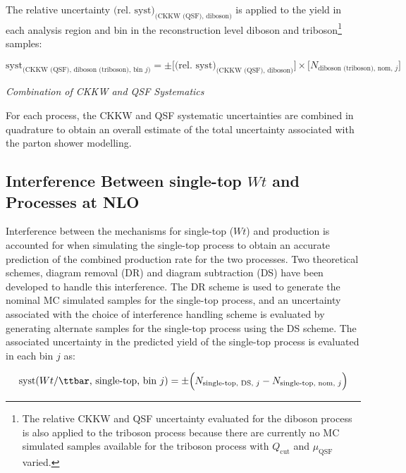\noindent The relative uncertainty \(\text{(rel. syst)}_\text{(CKKW (QSF), diboson)}\) is applied to the yield in each analysis region and bin in the reconstruction level diboson and triboson\footnote{The relative CKKW and QSF uncertainty evaluated for the diboson process is also applied to the triboson process because there are currently no MC simulated samples available for the triboson process with \(Q_\text{cut}\) and \(\mu_\text{QSF}\) varied.} samples:

\begin{footnotesize}
\begin{equation}
\label{eq:ckkw_wjets}
\text{syst}_\text{(CKKW (QSF), diboson (triboson), bin \(j\))} = \pm \bigg[\text{(rel. syst)}_\text{(CKKW (QSF), diboson)}\bigg] \times \bigg[N_\text{diboson (triboson), nom, \(j\)}\bigg]
\end{equation}
\end{footnotesize}

\vspace{1em}
\noindent\textit{Combination of CKKW and QSF Systematics}
\vspace{1em}

For each process, the CKKW and QSF systematic uncertainties are combined in quadrature to obtain an overall estimate of the total uncertainty associated with the parton shower modelling.

\subsection{Interference Between single-top \(Wt\) and \ttbar Processes at NLO}

Interference between the mechanisms for single-top (\(Wt\)) and \ttbar production \cite{Wt_interference} is accounted for when simulating the single-top process to obtain an accurate prediction of the combined production rate for the two processes. Two theoretical schemes, diagram removal (DR) and diagram subtraction (DS) have been developed to handle this interference. The DR scheme is used to generate the nominal MC simulated samples for the single-top process, and an uncertainty associated with the choice of interference handling scheme is evaluated by generating alternate samples for the single-top process using the DS scheme. The associated uncertainty in the predicted yield of the single-top process is evaluated in each bin \(j\) as:

\begin{equation}
\label{eq:ME_syst}
\text{syst}\text{(\(Wt\)/\ttbar, single-top, bin \(j\))}= \pm \Big(N_\text{single-top, DS, \(j\)} - N_\text{single-top, nom, \(j\)}\Big)
\end{equation}

